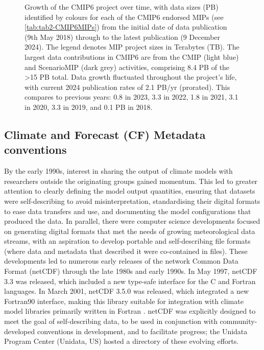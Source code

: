 \documentclass[manuscript]{copernicus}
\def\cred#1{{\color{red}#1}}
\begin{document}
\begin{figure}
    \centering
    
    \caption{Growth of the CMIP6 project over time, with data sizes (PB) identified by colours for each of the CMIP6 endorsed MIPs (see \autoref{tab:tab2-CMIP6MIPs}) from the initial date of data publication (9th May 2018) through to the latest publication (9 December 2024). The legend denotes MIP project sizes in Terabytes (TB). The largest data contributions in CMIP6 are from the CMIP (light blue) and ScenarioMIP (dark grey) activities, comprising 8.4 PB of the >15 PB total. Data growth fluctuated throughout the project's life, with current 2024 publication rates of 2.1 PB/yr (prorated). This compares to previous years: 0.8 in 2023, 3.3 in 2022, 1.8 in 2021, 3.1 in 2020, 3.3 in 2019, and 0.1 PB in 2018.}
    \label{fig:fig2-CMIP6DataGrowth}
\end{figure}


\subsection{Climate and Forecast (CF) Metadata conventions}
\label{sec:CFConventions}

By the early 1990s, interest in sharing the output of climate models with researchers outside the originating groups gained momentum. This led to greater attention to clearly defining the model output quantities, ensuring that datasets were self-describing to avoid misinterpretation, standardising their digital formats to ease data transfers and use, and documenting the model configurations that produced the data. In parallel, there were computer science developments focused on generating digital formats that met the needs of growing meteorological data streams, with an aspiration to develop portable and self-describing file formats (where data and metadata that described it were co-contained in files). These developments led to numerous early releases of the network Common Data Format (netCDF) through the late 1980s and early 1990s. In May 1997, netCDF 3.3 was released, which included a new type-safe interface for the C and Fortran languages. In March 2001, netCDF 3.5.0 was released, which integrated a new Fortran90 interface, making this library suitable for integration with climate model libraries primarily written in Fortran \citep{university_corporation_of_atmospheric_research_netcdf_2021}. netCDF was explicitly designed to meet the goal of self-describing data, to be used in conjunction with community-developed conventions in development, and to facilitate progress; the Unidata Program Center (Unidata, US) hosted a directory of these evolving efforts.
\end{document}

